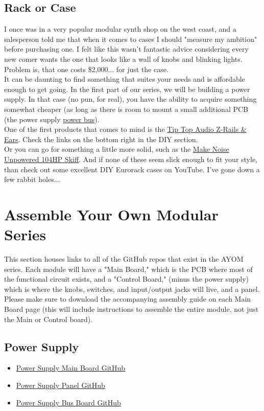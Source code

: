 \documentclass{article}
\begin{document}
\subsection{Rack or Case}
I once was in a very popular modular synth shop on the west coast, and a salesperson told me that when it comes to cases I should "measure my ambition" before purchasing one. I felt like this wasn't fantastic advice considering every new comer wants the one that looks like a wall of knobs and blinking lights. Problem is, that one costs \$2,000... for just the case.\\
\newline
It can be daunting to find something that suites your needs and is affordable enough to get going. In the first part of our series, we will be building a power supply. In that case (no pun, for real), you have the ability to acquire something somewhat cheaper (as long as there is room to mount a small additional PCB (the power supply \href{https://github.com/joshpanzarella/AYOM-Power-Supply-Bus}{power bus}).\\
\newline
One of the first products that comes to mind is the \href{http://tiptopaudio.com/products/}{Tip Top Audio Z-Rails \& Ears}. Check the links on the bottom right in the DIY section.\\
\newline
Or you can go for something a little more solid, such as the \href{https://www.perfectcircuit.com/make-noise-skiff-eurorack-case-104hp.html}{Make Noise Unpowered 104HP Skiff}. And if none of these seem slick enough to fit your style, than check out some excellent DIY Eurorack cases on YouTube. I've gone down a few rabbit holes...

\section{Assemble Your Own Modular Series}
This section houses links to all of the GitHub repos that exist in the AYOM series. Each module will have a "Main Board," which is the PCB where most of the functional circuit exists, and a "Control Board," (minus the power supply) which is where the knobs, switches, and input/output jacks will live, and a panel. Please make sure to download the accompanying assembly guide on each Main Board page (this will include instructions to assemble the entire module, not just the Main or Control board).
\subsection{Power Supply}
\begin{itemize}
	\item \href{https://github.com/joshpanzarella/AYOM-Power-Supply}{Power Supply Main Board GitHub}
	\item \href{https://github.com/joshpanzarella/AYOM-Power-Supply-Panel}{Power Supply Panel GitHub}
	\item \href{https://github.com/joshpanzarella/AYOM-Power-Supply-Bus}{Power Supply Bus Board GitHub}
\end{itemize}
\end{document}
